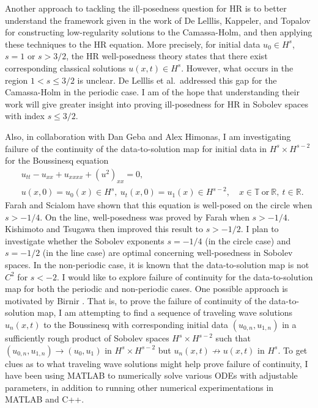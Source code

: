 \documentclass[12pt,reqno]{amsart}
\newcommand{\rr}{\mathbb{R}}
\newcommand{\ci}{\mathbb{T}}
\begin{document}
Another approach to tackling the ill-posedness question for HR is to better
understand the framework given in the work of De Lelllis, Kappeler, and Topalov
\cite{Lellis_2007_Low-regularity-} for constructing low-regularity solutions to
the Camassa-Holm, and then applying these techniques to the HR equation. More
precisely, for initial data $u_{0} \in H^{s}$, $s =1$ or $s > 3/2$, the HR
well-posedness theory states that there exist corresponding classical solutions
$u(x,t) \in H^{s}$. However, what occurs in the region $1 < s \le 3/2$ is
unclear. De Lelllis et al.\ addressed this gap for the Camassa-Holm in the
periodic case. I am of the hope that understanding their work will give greater
insight into proving ill-posedness for HR in Sobolev spaces with index $s \le
3/2$. 

Also, in collaboration with Dan Geba and Alex Himonas,
I am investigating failure of the continuity of the data-to-solution map for
initial data in $H^{s} \times H^{s-2}$ for the Boussinesq equation
\begin{align}
   & u_{tt} - u_{xx} + u_{xxxx} + (u^{2})_{xx} = 0,
  \\
   & u(x,0) = u_{0}(x) \in H^{s}, \  u_{t}(x,0) = u_{1}(x) \in H^{s-2},
  \quad x \in \ci \ \text{or} \ \rr, \ t \in \rr. 
\end{align} 
Farah and Scialom \cite{Farah:2010ys}  have shown that this equation is well-posed on the circle
when $s>-1/4$. On the line, well-posedness was proved 
by Farah \cite{Farah:2009uq} when $s>-1/4$. Kishimoto and Tsugawa
\cite{Kishimoto:2010ly} then improved this result to $s>-1/2$.  I  plan to
investigate whether the Sobolev exponents 
$s=-1/4$ (in the circle case) and  $s=-1/2$ (in the line case) 
are optimal concerning well-posedness in Sobolev spaces.
In the non-periodic case, it is known  \cite{Farah:2009uq} that
the data-to-solution map is not $C^2$ for $s< -2$.
I would like to explore failure of continuity
for the data-to-solution map for both the periodic
and non-periodic cases. One possible approach is motivated by Birnir
\cite{Birnir:1996uq}. That is, to prove the failure of continuity of the
data-to-solution map, I am attempting to find a sequence of traveling wave
solutions $u_{n}(x,t)$ to the Boussinesq with corresponding initial data
$(u_{0,n}, u_{1,n})$ in a sufficiently rough product of Sobolev spaces $H^{s} \times
H^{s-2}$ such that $(u_{0,n}, u_{1,n}) \to (u_{0}, u_{1})$ in
$H^{s} \times H^{s-2}$ but $u_{n}(x,t) \not \to u(x,t)$ in $H^{s}$. To get clues as to
what traveling wave solutions might help prove failure of continuity, I
have been using MATLAB to numerically solve various ODEs with adjustable
parameters, in addition to running other numerical experimentations in MATLAB
and C++. 
\end{document}
